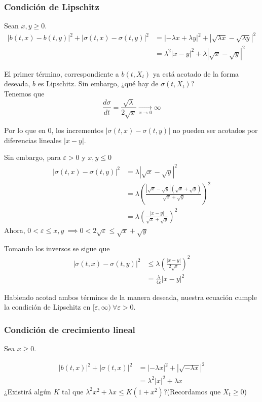 \documentclass[12pt]{article}
\begin{document}
\subsubsection*{Condición de Lipschitz}
Sean $x,y \geq 0.$
\begin{align*}
	|b(t,x) - b(t,y)|^2 + |\sigma(t, x) - \sigma(t,y)|^2 &= |-\lambda x + \lambda y|^2 + |\sqrt{\lambda x} - \sqrt{\lambda y}|^2 \\
	& = \lambda^2|x-y|^2 + \lambda|\sqrt{x} - \sqrt{y}|^2
\end{align*}

El primer término, correspondiente a $b(t,X_t)$ ya está acotado de la forma deseada, $b$ es Lipschitz. Sin embargo, ¿qué hay de $\sigma(t, X_t)$?\\

Tenemos que $$\frac{d\sigma}{dt} = \frac{\sqrt{\lambda}}{2\sqrt{x}} \xrightarrow[x\to 0]{} \infty$$

Por lo que en 0, los incrementos $|\sigma(t,x)-\sigma(t,y)|$ no pueden ser acotados por diferencias lineales $|x-y|.$

Sin embargo, para $\varepsilon>0$ y $x,y\leq 0$
\begin{align*}
	|\sigma(t,x) - \sigma(t, y)|^2 &= \lambda|\sqrt{x}-\sqrt{y}|^2 \\
	&= \lambda (\frac{|\sqrt{x}-\sqrt{y}|(\sqrt{x}+\sqrt{y})}{\sqrt{x}+\sqrt{y}})^2 \\
	&= \lambda (\frac{|x-y|}{\sqrt{x} + \sqrt{y}})^2
\end{align*}
Ahora, $0<\varepsilon \leq x,y\ \implies 0< 2\sqrt{\varepsilon} \leq \sqrt{x} + \sqrt{y}$

Tomando los inversos se sigue que
\begin{align*}
	|\sigma(t,x) - \sigma(t, y)|^2 & \leq  \lambda (\frac{|x-y|}{2\sqrt{\varepsilon}})^2\\
	&= \frac{\lambda}{4\varepsilon} |x-y|^2
\end{align*}

Habiendo acotad ambos términos de la manera deseada, nuestra ecuación cumple la condición de Lipschitz en $[\varepsilon, \infty)\ \forall \varepsilon > 0.$


\subsubsection*{Condición de crecimiento lineal}
Sea $x\geq 0$.

\begin{align*}
	|b(t,x)|^2 + |\sigma(t,x)|^2 &= |-\lambda x|^2 +|\sqrt{- \lambda x}|^2\\
	&= \lambda^2 |x|^2 + \lambda x
\end{align*}
¿Existirá algún $K$ tal que $\lambda^2 x^2 + \lambda x \leq K(1+x^2)$?\quad  (Recordamos que $X_t \geq 0$)
\end{document}
